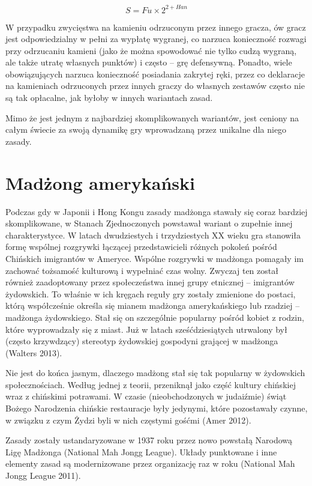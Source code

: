 	\begin{equation*}
		S = Fu \times 2^{2 + Han}
		\label{rīchi_scoring}
	\end{equation*}
	
W przypadku zwycięstwa na kamieniu odrzuconym przez innego gracza, ów gracz jest
odpowiedzialny w pełni za wypłatę wygranej, co narzuca konieczność rozwagi przy
odrzucaniu kamieni (jako że można spowodować nie tylko cudzą wygraną, ale także
utratę własnych punktów) i często -- grę defensywną. Ponadto, wiele
obowiązujących  narzuca konieczność posiadania zakrytej ręki, przez
co deklaracje na kamieniach odrzuconych przez innych graczy do własnych zestawów
często nie są tak opłacalne, jak byłoby w innych wariantach zasad.

Mimo że  jest jednym z najbardziej skomplikowanych wariantów, jest
ceniony na całym świecie za swoją dynamikę gry wprowadzaną przez unikalne dla
niego zasady. 

\section{Madżong amerykański}
\label{AMJ}
Podczas gdy w Japonii i Hong Kongu zasady madżonga stawały się coraz bardziej
skomplikowane, w Stanach Zjednoczonych powstawał wariant o zupełnie innej
charakterystyce. W latach dwudziestych i trzydziestych XX wieku gra stanowiła
formę wspólnej rozgrywki łączącej przedstawicieli różnych pokoleń pośród
Chińskich imigrantów w Ameryce. Wspólne rozgrywki w madżonga pomagały im
zachować tożsamość kulturową i wypełniać czas wolny. Zwyczaj ten został również
zaadoptowany przez społeczeństwa innej grupy etnicznej -- imigrantów żydowskich.
To właśnie w ich kręgach reguły gry zostały zmienione do postaci, którą
współcześnie określa się mianem madżonga amerykańskiego lub rzadziej --
madżonga żydowskiego. Stał się on szczególnie popularny pośród kobiet z rodzin,
które wyprowadzały się z miast. Już w latach sześćdziesiątych utrwalony był
(często krzywdzący) stereotyp żydowskiej gospodyni grającej w madżonga (Walters
2013).

Nie jest do końca jasnym, dlaczego madżong stał się tak popularny w żydowskich
społecznościach. Według jednej z teorii, przeniknął jako część kultury chińskiej
wraz z chińskimi potrawami.  W czasie (nieobchodzonych w judaiźmie)
świąt Bożego Narodzenia chińskie restauracje były jedynymi, które pozostawały
czynne, w związku z czym Żydzi byli w nich częstymi gośćmi (Amer 2012).

Zasady zostały ustandaryzowane w 1937 roku przez nowo powstałą Narodową Ligę
Madżonga (National Mah Jongg League). Układy punktowane i inne elementy zasad są
modernizowane przez organizację raz w roku (National Mah Jongg League 2011).

